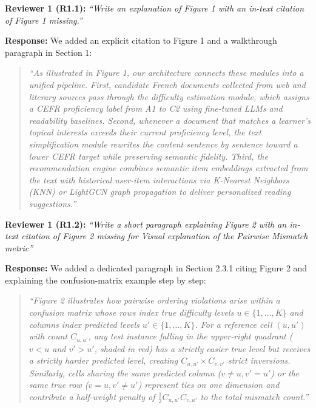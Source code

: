 \documentclass[11pt,a4paper]{article}
\begin{document}
\begin{reviewbox}
\textbf{Reviewer 1 (R1.1):} \textit{``Write an explanation of Figure 1 with an in-text citation of Figure 1 missing.''}
\end{reviewbox}

\noindent\textbf{Response:}
We added an explicit citation to Figure 1 and a walkthrough paragraph in Section 1:
\begin{quote}
\textit{``As illustrated in Figure 1, our architecture connects these modules into a unified pipeline. First, candidate French documents collected from web and literary sources pass through the difficulty estimation module, which assigns a CEFR proficiency label from A1 to C2 using fine-tuned LLMs and readability baselines. Second, whenever a document that matches a learner's topical interests exceeds their current proficiency level, the text simplification module rewrites the content sentence by sentence toward a lower CEFR target while preserving semantic fidelity. Third, the recommendation engine combines semantic item embeddings extracted from the text with historical user-item interactions via K-Nearest Neighbors (KNN) or LightGCN graph propagation to deliver personalized reading suggestions.''}
\end{quote}

\begin{reviewbox}
\textbf{Reviewer 1 (R1.2):} \textit{``Write a short paragraph explaining Figure 2 with an in-text citation of Figure 2 missing for Visual explanation of the Pairwise Mismatch metric''}
\end{reviewbox}

\noindent\textbf{Response:}
We added a dedicated paragraph in Section 2.3.1 citing Figure 2 and explaining the confusion-matrix example step by step:
\begin{quote}
\textit{``Figure 2 illustrates how pairwise ordering violations arise within a confusion matrix whose rows index true difficulty levels $u \in \{1, \dots, K\}$ and columns index predicted levels $u' \in \{1, \dots, K\}$. For a reference cell $(u, u')$ with count $C_{u,u'}$, any test instance falling in the upper-right quadrant ($v < u$ and $v' > u'$, shaded in red) has a strictly easier true level but receives a strictly harder predicted level, creating $C_{u,u'} \times C_{v,v'}$ strict inversions. Similarly, cells sharing the same predicted column ($v \neq u, v' = u'$) or the same true row ($v = u, v' \neq u'$) represent ties on one dimension and contribute a half-weight penalty of $\frac{1}{2} C_{u,u'} C_{v,u'}$ to the total mismatch count.''}
\end{quote}
\end{document}
